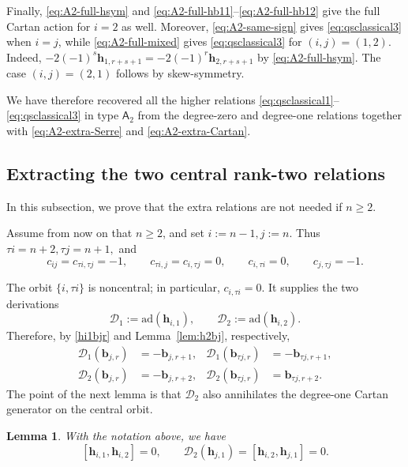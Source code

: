 \documentclass[11pt,reqno]{amsart}
\numberwithin{equation}{section}
\newtheorem{lem}[thm]{Lemma}
\theoremstyle{definition}
\theoremstyle{remark}
\newcommand{\cD}{\mathcal{D}}
\newcommand{\bb}{\mathbf{b}}
\newcommand{\bh}{\mathbf{h}}
\newcommand{\gge}{\geqslant}
\newcommand{\ad}{\mathrm{ad}}
\begin{document}
Finally, \eqref{eq:A2-full-hsym} and
\eqref{eq:A2-full-hb11}--\eqref{eq:A2-full-hb12} give the full
Cartan action for $i=2$ as well.  Moreover,
\eqref{eq:A2-same-sign} gives \eqref{eq:qsclassical3} when
$i=j$, while \eqref{eq:A2-full-mixed} gives
\eqref{eq:qsclassical3} for $(i,j)=(1,2)$.  Indeed,
$-2(-1)^s\bh_{1,r+s+1}
=
-2(-1)^r\bh_{2,r+s+1}$
by \eqref{eq:A2-full-hsym}.  The case $(i,j)=(2,1)$ follows by
skew-symmetry.

We have therefore recovered all the higher relations
\eqref{eq:qsclassical1}--\eqref{eq:qsclassical3} in type
$\mathsf A_2$ from the degree-zero and degree-one relations together
with \eqref{eq:A2-extra-Serre} and
\eqref{eq:A2-extra-Cartan}.

\subsection{Extracting the two central rank-two relations}
In this subsection, we prove that the extra relations are not needed if $n\gge 2$.  

Assume from now on that $n\gge2$, and set $i:=n-1, j:=n$.
Thus
$
\tau i=n+2,
\tau j=n+1,
$
and
\begin{equation*}
c_{ij}=c_{\tau i,\tau j}=-1,
\qquad
c_{\tau i,j}=c_{i,\tau j}=0,
\qquad
c_{i,\tau i}=0,
\qquad
c_{j,\tau j}=-1.
\end{equation*}

The orbit $\{i,\tau i\}$ is noncentral; in particular,
$c_{i,\tau i}=0$.  It supplies the two
derivations
\begin{equation*}
\cD_1:=\ad(\bh_{i,1}),
\qquad
\cD_2:=\ad(\bh_{i,2}).
\end{equation*}
Therefore, by \eqref{hi1bjr} and Lemma~\ref{lem:h2bj}, respectively,
\begin{align}
\cD_1(\bb_{j,r})
&=-\bb_{j,r+1},
&
\cD_1(\bb_{\tau j,r})
&=-\bb_{\tau j,r+1},
\label{eq:A2n-D1-action}
\\
\cD_2(\bb_{j,r})
&=-\bb_{j,r+2},
&
\cD_2(\bb_{\tau j,r})
&=\bb_{\tau j,r+2}.
\label{eq:A2n-D2-action}
\end{align}
The point of the next lemma is that $\cD_2$ also annihilates the
degree-one Cartan generator on the central orbit.

\begin{lem}\label{lem:A2n-neighboring-orbit}
With the notation above, we have
\begin{equation}\label{eq:A2n-outer-Cartan}
[\bh_{i,1},\bh_{i,2}]=0, \qquad \cD_2(\bh_{j,1})=[\bh_{i,2},\bh_{j,1}]
=0.
\end{equation}
\end{lem}
\end{document}
